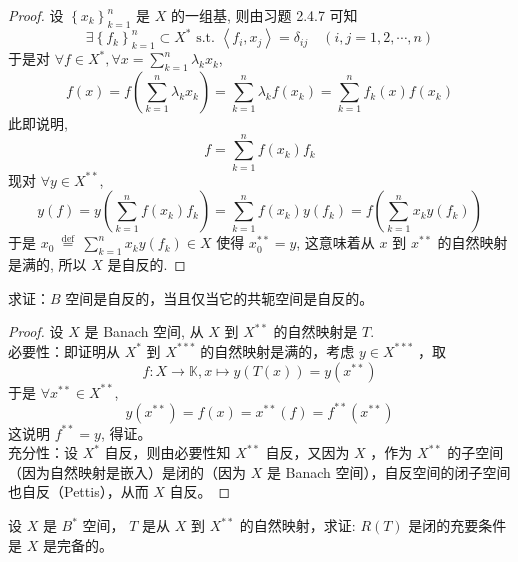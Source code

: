 \documentclass[lang=cn,newtx,10pt,scheme=chinese,thmcnt=chapter]{elegantbook}
\begin{document}
\begin{proof}
设 $\left\{x_k\right\}_{k=1}^n$ 是 $X$ 的一组基, 则由习题 2.4.7 可知
\begin{equation*}
\exists\left\{f_k\right\}_{k=1}^n \subset X^* \text { s.t. }\left\langle f_i, x_j\right\rangle=\delta_{i j} \quad(i, j=1,2, \cdots, n)
\end{equation*}
于是对 $\forall f \in X^*, \forall x=\sum_{k=1}^n \lambda_k x_k$,
\begin{equation*}
f(x)=f\left(\sum_{k=1}^n \lambda_k x_k\right)=\sum_{k=1}^n \lambda_k f\left(x_k\right)=\sum_{k=1}^n f_k(x) f\left(x_k\right)
\end{equation*}
此即说明,
\begin{equation*}
f=\sum_{k=1}^n f\left(x_k\right) f_k
\end{equation*}
现对 $\forall y \in X^{* *}$,
\begin{equation*}
y(f)=y\left(\sum_{k=1}^n f\left(x_k\right) f_k\right)=\sum_{k=1}^n f\left(x_k\right) y\left(f_k\right)=f\left(\sum_{k=1}^n x_k y\left(f_k\right)\right)
\end{equation*}
于是 $x_0 \stackrel{\text { def }}{=} \sum_{k=1}^n x_k y\left(f_k\right) \in X$ 使得 $x_0^{* *}=y$, 这意味着从 $x$ 到 $x^{* *}$ 的自然映射是满的, 所以 $X$ 是自反的.
\end{proof}
\begin{problem}
  求证：${B}$ 空间是自反的，当且仅当它的共轭空间是自反的。
\end{problem}
\begin{proof}
设 $X$ 是 Banach 空间, 从 $X$ 到 $X^{* *}$ 的自然映射是 $T$.\\
必要性：即证明从 $X^*$ 到 $X^{* * *}$ 的自然映射是满的，考虑 $y \in X^{* * *}$ ，取
\begin{equation*}
f: X \rightarrow \mathbb{K} , x \mapsto y(T(x))=y\left(x^{* *}\right)
\end{equation*}
于是 $\forall x^{* *} \in X^{* *}$,
\begin{equation*}
y\left(x^{* *}\right)=f(x)=x^{* *}(f)=f^{**}(x^{**})
\end{equation*}
这说明 $f^{* *}=y$, 得证。\\
充分性：设 $X^*$ 自反，则由必要性知 $X^{* *}$ 自反，又因为 $X$ ，作为 $X^{* *}$ 的子空间（因为自然映射是嵌入）是闭的（因为 $X$ 是 Banach 空间），自反空间的闭子空间也自反（Pettis），从而 $X$ 自反。
\end{proof}
\begin{problem}
  设 ${X}$ 是 ${B}^*$ 空间， $T$ 是从 ${X}$ 到 ${X}^{**}$ 的自然映射，求证: $R(T)$ 是闭的充要条件是 ${X}$ 是完备的。
\end{problem}
\end{document}
